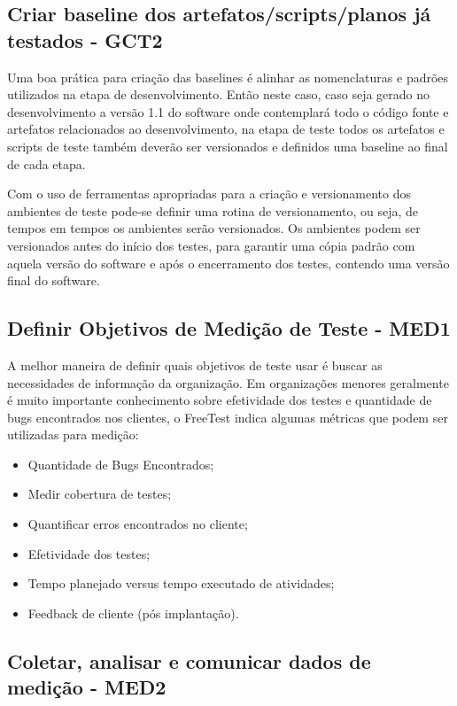 \subsection{Criar baseline dos artefatos/scripts/planos já testados - GCT2}

Uma boa prática para criação das baselines é alinhar as nomenclaturas e padrões utilizados na etapa de desenvolvimento. Então neste caso, caso seja gerado no desenvolvimento a versão 1.1 do software onde contemplará todo o código fonte e artefatos relacionados ao desenvolvimento, na etapa de teste todos os artefatos e scripts de teste também deverão ser versionados e definidos uma baseline ao final de cada etapa.

Com o uso de ferramentas apropriadas para a criação e versionamento dos ambientes de teste pode-se definir uma rotina de versionamento, ou seja, de tempos em tempos os ambientes serão versionados. Os ambientes podem ser versionados antes do início dos testes, para garantir uma cópia padrão com aquela versão do software e após o encerramento dos testes, contendo uma versão final do software.

\subsection{Definir Objetivos de Medição de Teste - MED1}

A melhor maneira de definir quais objetivos de teste usar é buscar as necessidades de informação da organização. Em organizações menores geralmente é muito importante conhecimento sobre efetividade dos testes e quantidade de bugs encontrados nos clientes, o FreeTest indica algumas métricas que podem ser utilizadas para medição:

\begin{itemize}
\item Quantidade de Bugs Encontrados;
\item Medir cobertura de testes;
\item Quantificar erros encontrados no cliente;
\item Efetividade dos testes;
\item Tempo planejado versus tempo executado de atividades;
\item Feedback de cliente (pós implantação).
\end{itemize}

\subsection{Coletar, analisar e comunicar dados de medição - MED2}

